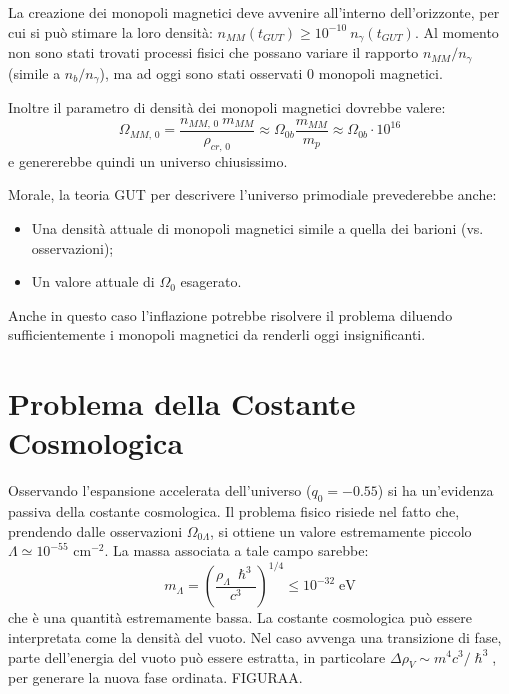 La creazione dei monopoli magnetici deve avvenire all'interno dell'orizzonte, per cui si può stimare la loro densità: $n_{MM}(t_{GUT})\ge 10^{-10} ~n_\gamma(t_{GUT})$. Al momento non sono stati trovati processi fisici che possano variare il rapporto $n_{MM}/n_\gamma$ (simile a $n_b/n_\gamma$), ma ad oggi sono stati osservati 0 monopoli magnetici.

Inoltre il parametro di densità dei monopoli magnetici dovrebbe valere:
\begin{equation*}
    \Omega_{MM,\, 0} = \frac{n_{MM,\, 0} ~m_{MM}}{\rho_{cr,\, 0}} \approx \Omega_{0b}\frac{m_{MM}}{m_p}\approx \Omega_{0b} \cdot 10^{16}
\end{equation*}
e genererebbe quindi un universo chiusissimo.

\vspace{1em}
\noindent Morale, la teoria GUT per descrivere l'universo primodiale prevederebbe anche:
\begin{itemize}
    \item Una densità attuale di monopoli magnetici simile a quella dei barioni (vs. osservazioni);
    \item Un valore attuale di $\Omega_0$ esagerato.
\end{itemize}
Anche in questo caso l'inflazione potrebbe risolvere il problema diluendo sufficientemente i monopoli magnetici da renderli oggi insignificanti.

\section{Problema della Costante Cosmologica}
Osservando l'espansione accelerata dell'universo ($q_0=-0.55$) si ha un'evidenza passiva della costante cosmologica. Il problema fisico risiede nel fatto che, prendendo dalle osservazioni $\Omega_{0\Lambda}$, si ottiene un valore estremamente piccolo $\Lambda\simeq 10^{-55}$ cm$^{-2}$. La massa associata a tale campo sarebbe:
$$
m_\Lambda = \left( \frac{\rho_\Lambda ~\hslash^3}{c^3}\right)^{1/4} \le 10^{-32}\; \mathrm{eV}
$$
che è una quantità estremamente bassa. La costante cosmologica può essere interpretata come la densità del vuoto. Nel caso avvenga una transizione di fase, parte dell'energia del vuoto può essere estratta, in particolare $\Delta \rho_V \sim m^4 c^3 / \hslash^3$, per generare la nuova fase ordinata. FIGURAA.


